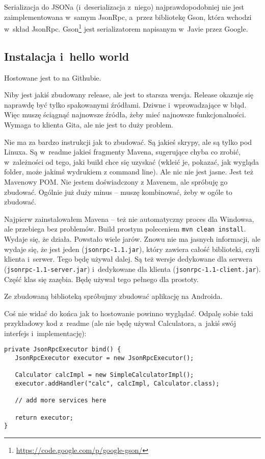 Serializacja do JSONa (i~deserializacja z~niego) najprawdopodobniej nie jest zaimplementowana w~samym JsonRpc, a~przez bibliotekę Gson, która wchodzi w~skład JsonRpc. Gson\footnote{\url{https://code.google.com/p/google-gson/}} jest serializatorem napisanym w~Javie przez Google.
 
\subsection{Instalacja i~hello world}
Hostowane jest to na Githubie.

Niby jest jakiś zbudowany release, ale jest to starsza wersja. Release okazuje się naprawdę być tylko spakowanymi źródłami. Dziwne i~wprowadzające w błąd.
Więc muszę ściągnąć najnowsze źródła, żeby mieć najnowsze funkcjonalności.
Wymaga to klienta Gita, ale nie jest to duży problem. 

Nie ma za bardzo instrukcji jak to zbudować. Są jakieś skrypy, ale są tylko pod Linuxa. Są w~readme jakieś fragmenty Mavena, sugerujące chyba co zrobić, w~zależności od tego, jaki build chce się uzyskać (wkleić je, pokazać, jak wygląda folder, może jakimś wydrukiem z command line). Ale nic nie jest jasne.
Jest też Mavenowy POM. Nie jestem doświadczony z Mavenem, ale spróbuję go zbudować. Ogólnie już duży minus -- muszę kombinować, żeby w ogóle to zbudować.

Najpierw zainstalowałem Mavena -- też nie automatyczny proces dla Windowsa, ale przebiega bez problemów. Build prostym poleceniem \texttt{mvn~clean~install}. Wydaje się, że działa.
Powstało wiele jarów.
Znowu nie ma jasnych informacji, ale wydaje się, że jest jeden (\texttt{jsonrpc-1.1.jar}), który zawiera całość biblioteki, czyli klienta i~serwer. Tego będę używał dalej. Są też wersje dedykowane dla serwera (\texttt{jsonrpc-1.1-server.jar}) i~dedykowane dla klienta (\texttt{jsonrpc-1.1-client.jar}). Część klas się zazębia.
Będę używał tego pełnego dla prostoty.

Ze zbudowaną biblioteką spróbujmy zbudować aplikację na Androida.

Coś nie widać do końca jak to hostowanie powinno wyglądać. Odpalę sobie taki przykładowy kod z~readme (ale nie będę używał Calculatora, a~jakiś swój interfejs i~implementację):
\begin{lstlisting}[frame=single, caption={Przykładowy sposób wystawiania serwera bez użycia serwletów}, label=kod:bla]
private JsonRpcExecutor bind() {
   JsonRpcExecutor executor = new JsonRpcExecutor();

   Calculator calcImpl = new SimpleCalculatorImpl();
   executor.addHandler("calc", calcImpl, Calculator.class); 

   // add more services here

   return executor;
}
\end{lstlisting}

